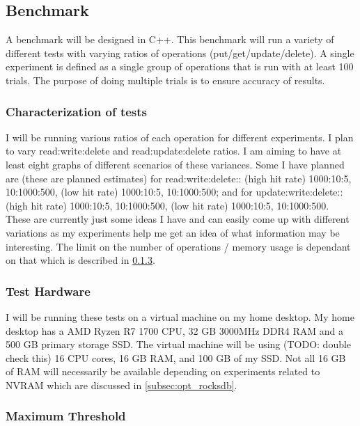 \documentclass{article}
\begin{document}
\subsection{Benchmark}

A benchmark will be designed in C++. This benchmark will run a variety of
different tests with varying ratios of operations (put/get/update/delete). A
single experiment is defined as a single group of operations that is run with at
least 100 trials. The purpose of doing multiple trials is to ensure accuracy of
results.

\subsubsection{Characterization of tests}
\label{subsubsec:characterization_tests}

I will be running various ratios of each operation for different experiments. I
plan to vary read:write:delete and read:update:delete ratios. I am aiming to
have at least eight graphs of different scenarios of these variances. Some I
have planned are (these are planned estimates) for read:write:delete:: (high hit
rate) 1000:10:5, 10:1000:500, (low hit rate) 1000:10:5, 10:1000:500; and for
update:write:delete:: (high hit rate) 1000:10:5, 10:1000:500, (low hit rate)
1000:10:5, 10:1000:500. These are currently just some ideas I have and can
easily come up with different variations as my experiments help me get an idea
of what information may be interesting. The limit on the number of operations /
memory usage is dependant on that which is described in
\ref{subsubsec:max_threshold}.

\subsubsection{Test Hardware}
\label{subsubsec:test_hw}

I will be running these tests on a virtual machine on my home desktop. My home
desktop has a AMD Ryzen R7 1700 CPU, 32 GB 3000MHz DDR4 RAM and a 500 GB primary
storage SSD. The virtual machine will be using (TODO: double check this) 16
CPU cores, 16 GB RAM, and 100 GB of my SSD. Not all 16 GB of RAM will
necessarily be available depending on experiments related to NVRAM which are
discussed in \ref{subsec:opt_rocksdb}.

\subsubsection{Maximum Threshold}
\label{subsubsec:max_threshold}
\end{document}
